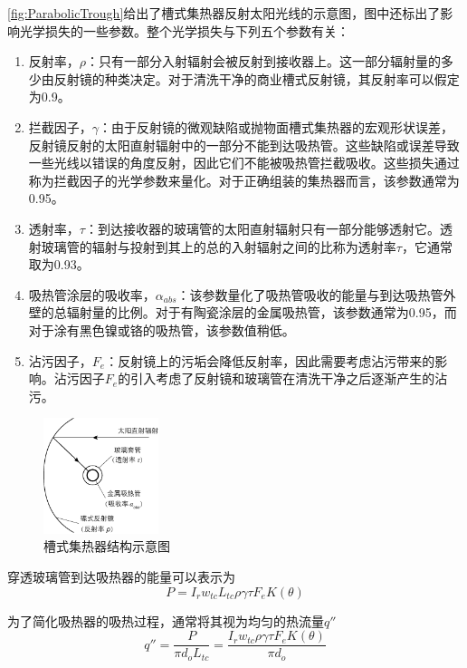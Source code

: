 \autoref{fig:ParabolicTrough}给出了槽式集热器反射太阳光线的示意图，图中还标出了影响光学损失的一些参数。整个光学损失与下列五个参数有关：

\begin{enumerate}[label=(\arabic*)]
  \item 反射率，$\rho$：只有一部分入射辐射会被反射到接收器上。这一部分辐射量的多少由反射镜的种类决定。对于清洗干净的商业槽式反射镜，其反射率可以假定为0.9。
  \item 拦截因子，$\gamma$：由于反射镜的微观缺陷或抛物面槽式集热器的宏观形状误差，反射镜反射的太阳直射辐射中的一部分不能到达吸热管。这些缺陷或误差导致一些光线以错误的角度反射，因此它们不能被吸热管拦截吸收。这些损失通过称为拦截因子的光学参数来量化。对于正确组装的集热器而言，该参数通常为0.95。
  \item 透射率，$\tau$：到达接收器的玻璃管的太阳直射辐射只有一部分能够透射它。透射玻璃管的辐射与投射到其上的总的入射辐射之间的比称为透射率$\tau$，它通常取为0.93。
  \item 吸热管涂层的吸收率，$\alpha_{abs}$：该参数量化了吸热管吸收的能量与到达吸热管外壁的总辐射量的比例。对于有陶瓷涂层的金属吸热管，该参数通常为0.95，而对于涂有黑色镍或铬的吸热管，该参数值稍低。
  \item 沾污因子，$F_e$：反射镜上的污垢会降低反射率，因此需要考虑沾污带来的影响。沾污因子$F_e$的引入考虑了反射镜和玻璃管在清洗干净之后逐渐产生的沾污。
\end{enumerate}

\begin{figure}[!ht]
\centering
\includegraphics[width=0.3\textwidth]{fig/ParametersOfParabolicDish.pdf}
\caption{槽式集热器结构示意图}\label{fig:ParabolicTrough}
\end{figure}

穿透玻璃管到达吸热器的能量可以表示为
\begin{equation}
  P = I_r w_{tc} L_{tc} \rho \gamma \tau F_e K(\theta)
\end{equation}

为了简化吸热器的吸热过程，通常将其视为均匀的热流量$q''$
\begin{equation}
  q''= \frac{P}{\pi d_o L_{tc}} = \frac{I_r w_{tc} \rho \gamma \tau F_e K(\theta)}{\pi d_o}
\end{equation}

